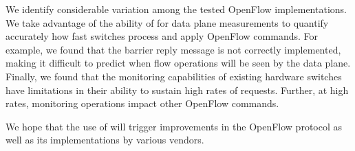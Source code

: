 We identify considerable variation among the tested OpenFlow implementations.
We take advantage of the ability of \oflops for data plane measurements to
quantify accurately how fast switches process and apply OpenFlow commands.
For example, we found that the barrier reply message is not correctly implemented,
making it difficult to predict when flow operations will be seen by the data plane.
Finally, we found that the monitoring capabilities of existing hardware switches 
have limitations in their ability to sustain high rates of requests. Further, at high 
rates, monitoring operations impact other OpenFlow commands.

We hope that the use of \oflops will trigger improvements in the
OpenFlow protocol as well as its implementations by various vendors.



